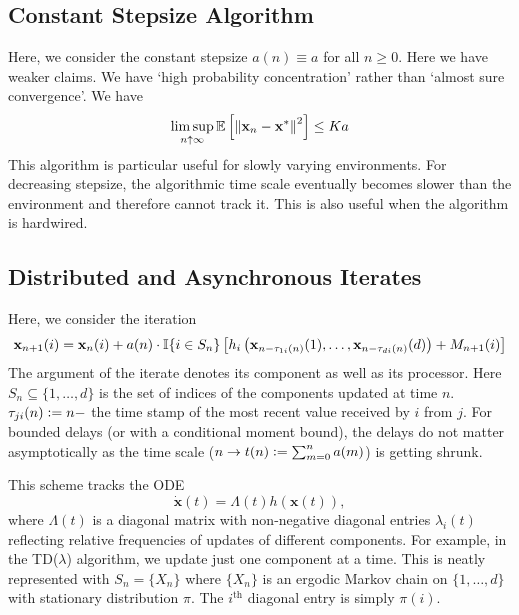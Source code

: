 \subsection{Constant Stepsize Algorithm}

Here, we consider the constant stepsize $a(n) \equiv a$ for all $n \geq 0$. Here we have weaker claims. We have `high probability concentration' rather than `almost sure convergence'. We have
\[
    \limsup_{n \uparrow \infty} \mathbb{E} \left[ \norm{\mathbf{x}_n - \mathbf{x}^*}^2 \right] \leq Ka
\]
This algorithm is particular useful for slowly varying environments. For decreasing stepsize, the algorithmic time scale eventually becomes slower than the environment and therefore cannot track it. This is also useful when the algorithm is hardwired. 

\subsection{Distributed and Asynchronous Iterates}

Here, we consider the iteration
\[
    \mathbf{x}_{n+1}(i) = \mathbf{x}_n(i) + a(n)\cdot \mathbb{I}\{i \in S_n\} \left[ h_i\left( \mathbf{x}_{n -\tau_{1i}(n)}(1), \ldots, \mathbf{x}_{n -\tau_{di}(n)}(d) \right) + M_{n+1}(i) \right]
\]
The argument of the iterate denotes its component as well as its processor. Here $S_n \subseteq \{1,\ldots,d\}$ is the set of indices of the components updated at time $n$. $\tau_{ji}(n) \vcentcolon= n - $ the time stamp of the most recent value received by $i$ from $j$. For bounded delays (or with a conditional moment bound), the delays do not matter asymptotically as the time scale ($n \to t(n) \vcentcolon= \sum_{m=0}^n a(m)$) is getting shrunk. 

This scheme tracks the ODE
\[
    \dot{\mathbf{x}}(t) = \Lambda(t) h(\mathbf{x}(t)),
\]
where $\Lambda(t)$ is a diagonal matrix with non-negative diagonal entries $\lambda_i(t)$ reflecting relative frequencies of updates of different components. For example, in the TD($\lambda$) algorithm, we update just one component at a time. This is neatly represented with $S_n = \{X_n\}$ where $\{X_n\}$ is an ergodic Markov chain on $\{1,\ldots,d\}$ with stationary distribution $\pi$. The $i^{\text{th}}$ diagonal entry is simply $\pi(i)$. 

